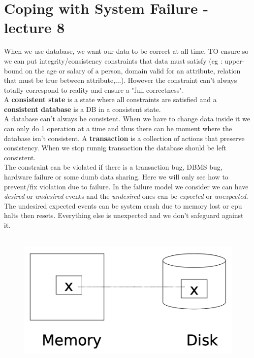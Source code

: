 \documentclass[12pt,a4paper]{article}
\begin{document}
\section{Coping with System Failure - lecture 8}
When we use database, we want our data to be correct at all time. TO ensure so we can put integrity/consistency constraints that data must satisfy (eg : upper-bound on the age or salary of a person, domain valid for an attribute, relation that must be true between attribute,...). However the constraint can't always totally correspond to reality and ensure a "full correctness".\\
A \textbf{consistent state} is a state where all constraints are satisfied and a \textbf{consistent database} is a DB in a consistent state.\\
A database can't always be consistent. When we have to change data inside it we can only do 1 operation at a time and thus there can be moment where the database isn't consistent. A \textbf{transaction} is a collection of actions that preserve consistency. When we stop runnig transaction the database should be left consistent.\\
The constraint can be violated if there is a transaction bug, DBMS bug, hardware failure or some dumb data sharing. Here we will only see how to prevent/fix violation due to failure. In the failure model we consider we can have \emph{desired} or \emph{undesired} events and the \emph{undesired} ones can be \emph{expected} or \emph{unexpected}. The undesired expected events can be system crash due to memory lost or cpu halts then resets. Everything else is unexpected and we don't safeguard against it.\\
\\
\begin{figure}
\vspace{-8mm}
\includegraphics[scale=0.37]{img/img60.png}
\end{figure}
\end{document}
